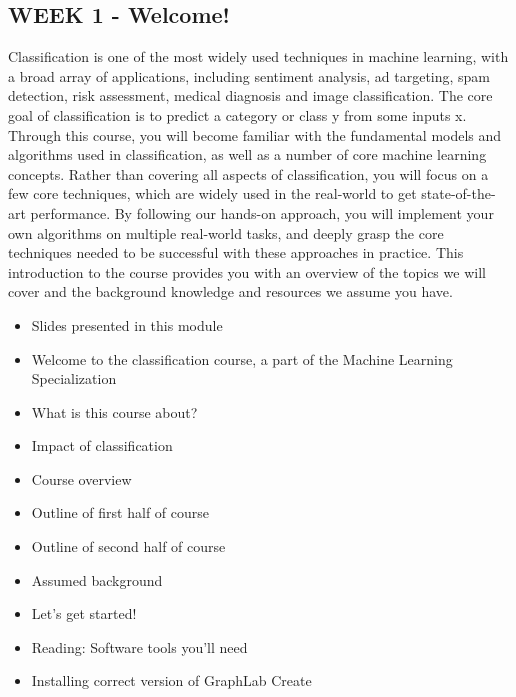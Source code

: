 \subsection{WEEK 1 - Welcome!}
Classification is one of the most widely used techniques in machine learning, with a broad array of applications, including sentiment analysis, ad targeting, spam detection, risk assessment, medical diagnosis and image classification. The core goal of classification is to predict a category or class y from some inputs x. Through this course, you will become familiar with the fundamental models and algorithms used in classification, as well as a number of core machine learning concepts. Rather than covering all aspects of classification, you will focus on a few core techniques, which are widely used in the real-world to get state-of-the-art performance. By following our hands-on approach, you will implement your own algorithms on multiple real-world tasks, and deeply grasp the core techniques needed to be successful with these approaches in practice. This introduction to the course provides you with an overview of the topics we will cover and the background knowledge and resources we assume you have.
\begin{itemize}
\item Slides presented in this module
\item Welcome to the classification course, a part of the Machine Learning Specialization
\item What is this course about?
\item Impact of classification
\item Course overview
\item Outline of first half of course
\item Outline of second half of course
\item Assumed background
\item Let's get started!
\item Reading: Software tools you'll need
\item Installing correct version of GraphLab Create
\end{itemize}
\newpage
